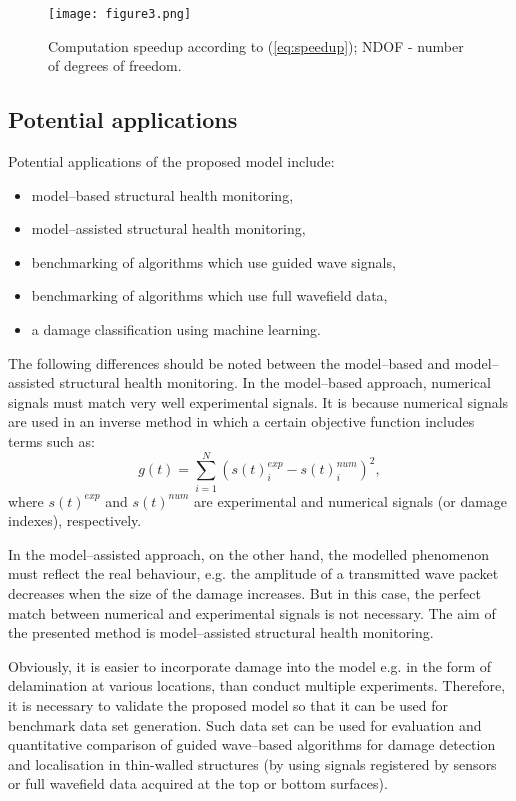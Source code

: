 \documentclass[12pt]{iopart}
\begin{document}
\begin{figure} [h!]
	\centering
	\texttt{[image: figure3.png]}	
	\caption{Computation speedup according to (\ref{eq:speedup}); NDOF - number of degrees of freedom.}
	\label{fig:speedup}
\end{figure}
\newpage

\subsection{Potential applications}

Potential applications of the proposed model include:
\begin{itemize}
	\item model--based structural health monitoring,
	\item model--assisted structural health monitoring,
	\item benchmarking of algorithms which use guided wave signals,
	\item benchmarking of algorithms which use full wavefield data,
	\item a damage classification using machine learning.
\end{itemize}
The following differences should be noted  between the model--based and model--assisted structural health monitoring.
In the model--based approach, numerical signals must match very well experimental signals. It is because numerical signals are used in an inverse method in which a certain objective function includes terms such as:
\begin{equation}
g(t) = \sum_{i=1}^{N} \left(s(t)_i^{exp} - s(t)_i^{num}\right)^2,
\label{eq:obj_fun}
\end{equation}
where \(s(t)^{exp}\) and \(s(t)^{num}\) are experimental and numerical signals (or damage indexes), respectively.

In the model--assisted approach, on the other hand, the modelled phenomenon must reflect the real behaviour, e.g. the amplitude of a transmitted wave packet decreases when the size of the damage increases. But in this case, the perfect match between numerical and experimental signals is not necessary. The aim of the presented method is model--assisted structural health monitoring.

Obviously, it is easier to incorporate damage into the model e.g. in the form of delamination at various locations, than conduct multiple experiments. Therefore, it is necessary to validate the proposed model so that it can be used for benchmark data set generation. Such data set can be used for evaluation and quantitative comparison of guided wave--based algorithms for damage detection and localisation in thin-walled structures (by using signals registered by sensors or full wavefield data acquired at the top or bottom surfaces).
\end{document}
